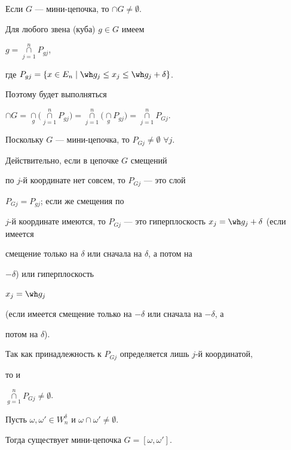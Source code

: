 \begin{lem} 


Если $G$ --- мини-цепочка, то $\cap G\ne\emptyset$. 


\end{lem} 


 


\begin{pf} 


Для любого звена (куба) $g\in G$ имеем 


$g=\mathop{\cap}\limits^n_{j=1}P_{gj}$, 


где $P_{gj}=\{x\in E_n\mid\wh g_j\le x_j\le\wh g_j+\delta\}$. 


Поэтому будет выполняться 


$\cap G=\mathop{\cap}\limits_g\big(\mathop{\cap}\limits^n_{j=1} 


P_{gj}\big)=\mathop{\cap}\limits^n_{j=1}\big(\mathop{\cap}\limits_g 


P_{gj}\big)=\mathop{\cap}\limits^n_{j=1}P_{Gj}$. 


Поскольку $G$ --- мини-цепочка, то $P_{Gj}\ne\emptyset$ $\forall j$. 


Действительно, если в цепочке $G$ смещений 


по $j$-й координате нет совсем, то $P_{Gj}$ --- это слой 


$P_{Gj}=P_{gj}$; если же смещения по 


$j$-й координате имеются, то $P_{Gj}$ --- это гиперплоскость $x_j=\wh 


g_j+\delta$ (если имеется 


смещение только на $\delta$ или сначала на $\delta$, а потом на 


$-\delta$) или гиперплоскость 


$x_j=\wh g_j$ 


(если имеется смещение только на $-\delta$ или сначала на $-\delta$, а 


потом на $\delta$). 


 


Так как принадлежность к $P_{Gj}$ определяется лишь $j$-й координатой, 


то и 


$\mathop{\cap}\limits^n_{g=1}P_{Gj}\ne\emptyset$. 


\end{pf} 


 


\begin{lem} 


Пусть $\omega,\omega'\in W^\delta_n$ и $\omega\cap\omega'\ne\emptyset$. 


Тогда существует мини-цепочка $G=[\omega,\omega']$. 


\end{lem} 


